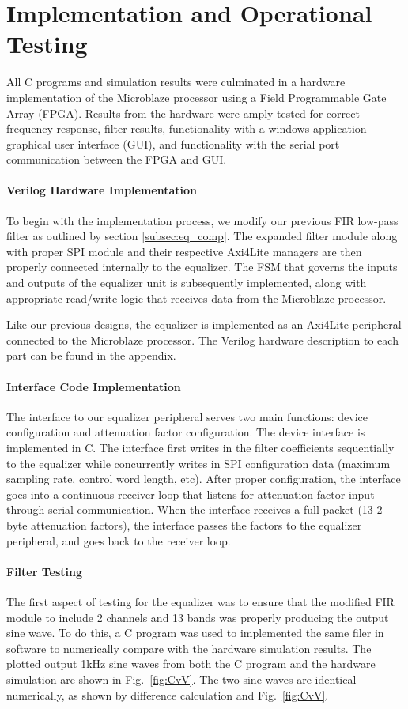 \documentclass[journal]{IEEEtran} %
\begin{document}
\section{Implementation and Operational Testing}\label{sec:implementation}
All C programs and simulation results were culminated in a hardware implementation of the Microblaze processor using a Field Programmable Gate Array (FPGA). Results from the hardware were amply tested for correct frequency response, filter results, functionality with a windows application graphical user interface (GUI), and functionality with the serial port communication between the FPGA and GUI.

\paragraph{Verilog Hardware Implementation}
To begin with the implementation process, we modify our previous FIR low-pass filter as outlined by section \ref{subsec:eq_comp}. The expanded filter module along with proper SPI module and their respective Axi4Lite managers are then properly connected internally to the equalizer. The FSM that governs the inputs and outputs of the equalizer unit is subsequently implemented, along with appropriate read/write logic that receives data from the Microblaze processor. 

Like our previous designs, the equalizer is implemented as an Axi4Lite peripheral connected to the Microblaze processor. The Verilog hardware description to each part can be found in the appendix.

\paragraph{Interface Code Implementation}
The interface to our equalizer peripheral serves two main functions: device configuration and attenuation factor configuration. The device interface is implemented in C. The interface first writes in the filter coefficients sequentially to the equalizer while concurrently writes in SPI configuration data (maximum sampling rate, control word length, etc). After proper configuration, the interface goes into a continuous receiver loop that listens for attenuation factor input through serial communication. When the interface receives a full packet (13 2-byte attenuation factors), the interface passes the factors to the equalizer peripheral, and goes back to the receiver loop.

\paragraph{Filter Testing} The first aspect of testing for the equalizer was to ensure that the modified FIR module to include 2 channels and 13 bands was properly producing the output sine wave. To do this, a C program was used to implemented the same filer in software to numerically compare with the hardware simulation results. The plotted output 1kHz sine waves from both the C program and the hardware simulation are shown in Fig.~\ref{fig:CvV}. The two sine waves are identical numerically, as shown by difference calculation and Fig.~\ref{fig:CvV}.
\end{document}
